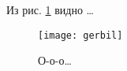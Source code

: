 \documentclass{article}
\begin{document}
Из рис. \ref{fig:gerbil} видно \dots
\begin{figure}
\centering
\texttt{[image: gerbil]}
\caption{О-о-о\dots}\label{fig:gerbil}
\end{figure}
\end{document}

